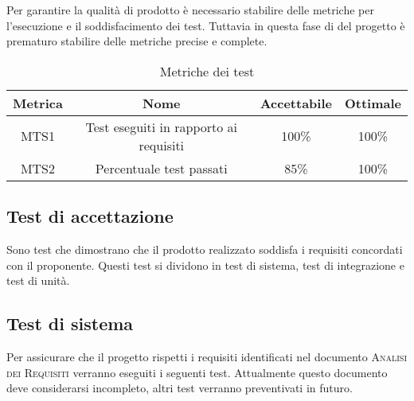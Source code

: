 \documentclass[../piano_di_qualifica.tex]{subfiles}
\begin{document}
Per garantire la qualità di prodotto è necessario stabilire delle metriche per l’esecuzione e il soddisfacimento dei test. Tuttavia in questa fase di del progetto è prematuro stabilire delle metriche precise e complete.


\begin{table}[!ht]
	\centering
	\begin{tabular}{|c|c|c|c|}
		\hline
		\rowcolor{lightgray}
		\textbf{Metrica} & \textbf{Nome}                          & \textbf{Accettabile} & \textbf{Ottimale} \\
		\hline
		MTS1             & Test eseguiti in rapporto ai requisiti & 100\%                       & 100\%                       \\
		MTS2             & Percentuale test passati               & 85\%                        & 100\%                       \\
		\hline
	\end{tabular}
	\caption{Metriche dei test}
\end{table}

\subsection{Test di accettazione}%
\label{sub:test_accett}
Sono test che dimostrano che il prodotto realizzato soddisfa i requisiti concordati con il proponente.
Questi test si dividono in test di sistema, test di integrazione e test di unità.

\subsection{Test di sistema}%
\label{sub:test_sist}
Per assicurare che il progetto rispetti i requisiti identificati nel documento \textsc{Analisi dei Requisiti} verranno eseguiti i seguenti test. Attualmente questo documento deve considerarsi incompleto, altri test verranno preventivati in futuro.
\end{document}
